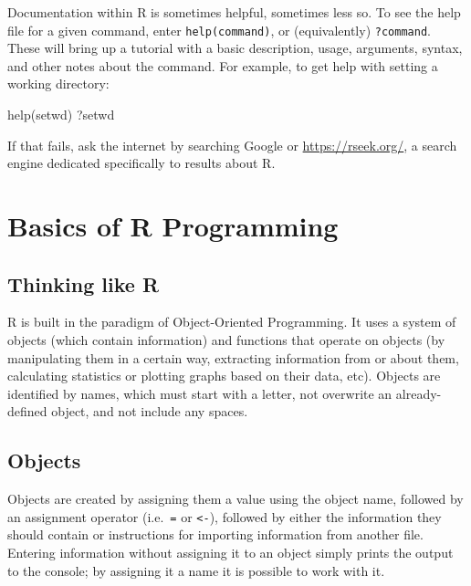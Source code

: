 \documentclass[
  12pt,
]{krantz}
\newenvironment{Shaded}{\begin{snugshade}}{\end{snugshade}}
\newcommand{\FunctionTok}[1]{\textcolor[rgb]{0.00,0.00,0.00}{#1}}
\newcommand{\NormalTok}[1]{#1}
\begin{document}
Documentation within R is sometimes helpful, sometimes less so. To see the help file for a given command, enter \texttt{help(command)}, or (equivalently) \texttt{?command}. These will bring up a tutorial with a basic description, usage, arguments, syntax, and other notes about the command. For example, to get help with setting a working directory:

\begin{Shaded}
\begin{Highlighting}[]
  \FunctionTok{help}\NormalTok{(setwd)}
\NormalTok{  ?setwd}
\end{Highlighting}
\end{Shaded}

If that fails, ask the internet by searching Google or \url{https://rseek.org/}, a search engine dedicated specifically to results about R.

\hypertarget{basics-of-r-programming}{%
\chapter{Basics of R Programming}\label{basics-of-r-programming}}

\hypertarget{thinking-like-r}{%
\section{Thinking like R}\label{thinking-like-r}}

R is built in the paradigm of Object-Oriented Programming. It uses a system of objects (which contain information) and functions that operate on objects (by manipulating them in a certain way, extracting information from or about them, calculating statistics or plotting graphs based on their data, etc). Objects are identified by names, which must start with a letter, not overwrite an already-defined object, and not include any spaces.

\hypertarget{objects}{%
\section{Objects}\label{objects}}

Objects are created by assigning them a value using the object name, followed by an assignment operator (i.e.~\texttt{=} or \texttt{\textless{}-}), followed by either the information they should contain or instructions for importing information from another file. Entering information without assigning it to an object simply prints the output to the console; by assigning it a name it is possible to work with it.
\end{document}
